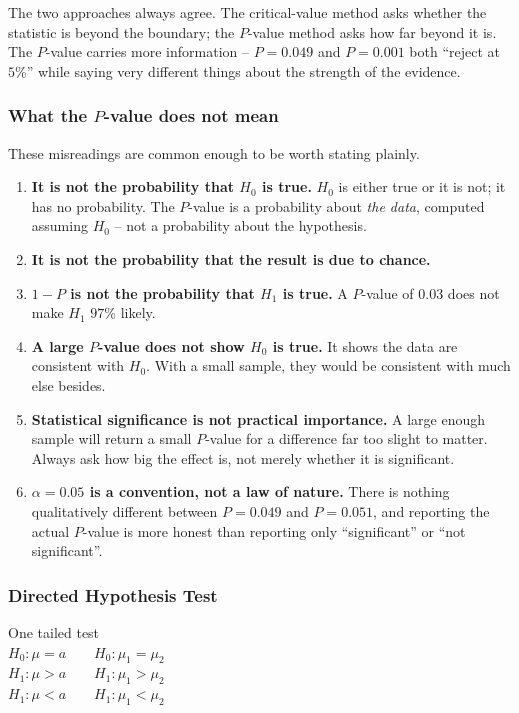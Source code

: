 \documentclass[11pt,a4paper]{article}
\theoremstyle{definition}
\begin{document}
The two approaches always agree. The critical-value method asks whether the statistic is
beyond the boundary; the $P$-value method asks how far beyond it is. The $P$-value carries
more information -- $P = 0.049$ and $P = 0.001$ both ``reject at $5\%$'' while saying very
different things about the strength of the evidence.

\subsubsection{What the $P$-value does not mean}

These misreadings are common enough to be worth stating plainly.

\begin{enumerate}
\item \textbf{It is not the probability that $H_0$ is true.} $H_0$ is either true or it is
not; it has no probability. The $P$-value is a probability about \emph{the data}, computed
assuming $H_0$ -- not a probability about the hypothesis.

\item \textbf{It is not the probability that the result is due to chance.}

\item \textbf{$1-P$ is not the probability that $H_1$ is true.} A $P$-value of $0.03$ does
not make $H_1$ $97\%$ likely.

\item \textbf{A large $P$-value does not show $H_0$ is true.} It shows the data are
consistent with $H_0$. With a small sample, they would be consistent with much else
besides.

\item \textbf{Statistical significance is not practical importance.} A large enough sample
will return a small $P$-value for a difference far too slight to matter. Always ask how
big the effect is, not merely whether it is significant.

\item \textbf{$\alpha=0.05$ is a convention, not a law of nature.} There is nothing
qualitatively different between $P = 0.049$ and $P = 0.051$, and reporting the actual
$P$-value is more honest than reporting only ``significant'' or ``not significant''.
\end{enumerate}







\subsubsection{Directed Hypothesis Test}
One tailed test\\
$H_0:\mu =a\qquad  H_0:\mu_1=\mu_2$\\
$H_1:\mu >a\qquad  H_1:\mu_1>\mu_2$\\
$H_1:\mu <a\qquad  H_1:\mu_1<\mu_2$\\[1ex]
\end{document}
